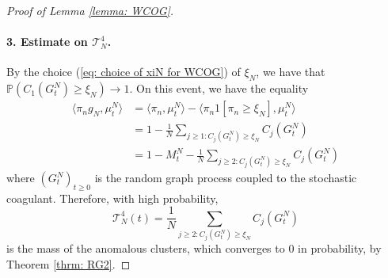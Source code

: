 \begin{proof}[Proof of Lemma \ref{lemma: WCOG}]
       \paragraph{3. Estimate on $\mathcal{T}^4_N$.} By the choice (\ref{eq: choice of xiN for WCOG}) of $\xi_N$, we have that $\mathbb{P}( C_1(G^N_t)\geq \xi_N)\rightarrow 1.$ On this event, we have the equality \begin{equation}
           \begin{split}
               \langle \pi_n g_N, \mu^N_t\rangle &=\langle \pi_n, \mu^N_t\rangle - \langle \pi_n 1[\pi_n\geq \xi_N], \mu^N_t\rangle \\[2ex] & = 1-\frac{1}{N}\sum_{j\geq 1: C_j(G^N_t)\ge \xi_N} C_j(G^N_t) \\[2ex] & = 1-M^N_t-\frac{1}{N}\sum_{j\ge 2:C_j(G^N_t)\ge \xi_N} C_j(G^N_t) 
           \end{split} 
       \end{equation} where $(G^N_t)_{t\geq 0}$ is the random graph process coupled to the stochastic coagulant. Therefore, with high probability, \begin{equation} \mathcal{T}^4_N(t) = \frac{1}{N} \sum_{j\ge 2:C_j(G^N_t)\ge \xi_N} C_j(G^N_t) \end{equation} is the mass of the anomalous clusters, which converges to $0$ in probability, by Theorem \ref{thrm: RG2}.

\end{proof}

